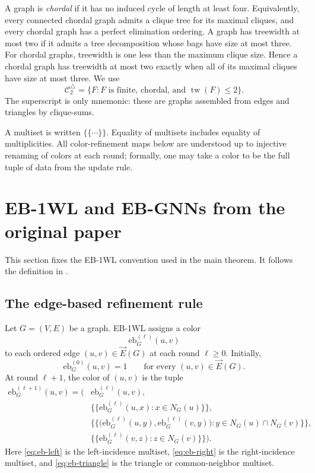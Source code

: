 \documentclass[11pt]{article}
\DeclareMathOperator{\tw}{tw}
\newcommand{\cC}{\mathcal{C}}
\newcommand{\vecE}{\overrightarrow{E}}
\newcommand{\mset}[1]{\{\!\{#1\}\!\}}
\begin{document}
A graph is \emph{chordal} if it has no induced cycle of length at least four.  Equivalently, every connected chordal graph admits a clique tree for its maximal cliques, and every chordal graph has a perfect elimination ordering.  A graph has treewidth at most two if it admits a tree decomposition whose bags have size at most three.  For chordal graphs, treewidth is one less than the maximum clique size.  Hence a chordal graph has treewidth at most two exactly when all of its maximal cliques have size at most three.  We use
\[
\cC_2^\triangle=\{F:F\text{ is finite, chordal, and }\tw(F)\leq 2\}.
\]
The superscript is only mnemonic: these are graphs assembled from edges and triangles by clique-sums.

A multiset is written $\mset{\cdots}$.  Equality of multisets includes equality of multiplicities.  All color-refinement maps below are understood up to injective renaming of colors at each round; formally, one may take a color to be the full tuple of data from the update rule.

\section{EB-1WL and EB-GNNs from the original paper}
\label{sec:eb1wl}

This section fixes the EB-1WL convention used in the main theorem.  It follows the definition in \cite{EBWL}.

\subsection{The edge-based refinement rule}

Let $G=(V,E)$ be a graph.  EB-1WL assigns a color
\[
\mathrm{eb}^{(\ell)}_G(u,v)
\]
to each ordered edge $(u,v)\in\vecE(G)$ at each round $\ell\geq 0$.  Initially,
\[
\mathrm{eb}^{(0)}_G(u,v)=1
\qquad\text{for every }(u,v)\in\vecE(G).
\]
At round $\ell+1$, the color of $(u,v)$ is the tuple
\begin{align}
\mathrm{eb}^{(\ell+1)}_G(u,v)=\Big(&
\mathrm{eb}^{(\ell)}_G(u,v),
\label{eq:eb-old}\\
&\mset{\mathrm{eb}^{(\ell)}_G(u,x):x\in N_G(u)},
\label{eq:eb-left}\\
&\mset{\bigl(\mathrm{eb}^{(\ell)}_G(u,y),\mathrm{eb}^{(\ell)}_G(v,y)\bigr):y\in N_G(u)\cap N_G(v)},
\label{eq:eb-triangle}\\
&\mset{\mathrm{eb}^{(\ell)}_G(v,z):z\in N_G(v)}
\Big).
\label{eq:eb-right}
\end{align}
Here \eqref{eq:eb-left} is the left-incidence multiset, \eqref{eq:eb-right} is the right-incidence multiset, and \eqref{eq:eb-triangle} is the triangle or common-neighbor multiset.
\end{document}
